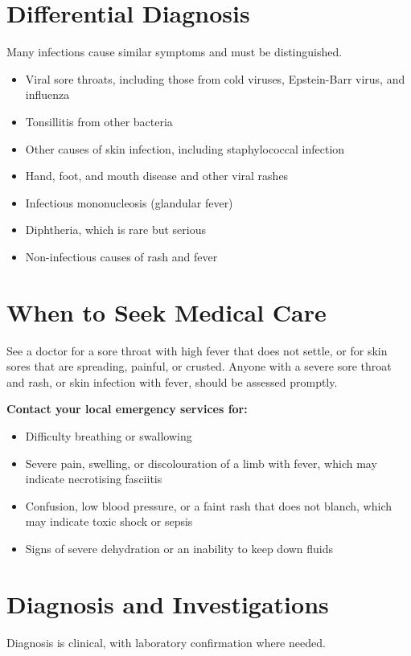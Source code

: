 \section*{Differential Diagnosis}
Many infections cause similar symptoms and must be distinguished.

\begin{itemize}
    \item Viral sore throats, including those from cold viruses, Epstein-Barr virus, and influenza
    \item Tonsillitis from other bacteria
    \item Other causes of skin infection, including staphylococcal infection
    \item Hand, foot, and mouth disease and other viral rashes
    \item Infectious mononucleosis (glandular fever)
    \item Diphtheria, which is rare but serious
    \item Non-infectious causes of rash and fever
\end{itemize}

\section*{When to Seek Medical Care}
See a doctor for a sore throat with high fever that does not settle, or for skin sores that are spreading, painful, or crusted. Anyone with a severe sore throat and rash, or skin infection with fever, should be assessed promptly.

\textbf{Contact your local emergency services for:}
\begin{itemize}
    \item Difficulty breathing or swallowing
    \item Severe pain, swelling, or discolouration of a limb with fever, which may indicate necrotising fasciitis
    \item Confusion, low blood pressure, or a faint rash that does not blanch, which may indicate toxic shock or sepsis
    \item Signs of severe dehydration or an inability to keep down fluids
\end{itemize}

\section*{Diagnosis and Investigations}
Diagnosis is clinical, with laboratory confirmation where needed.


